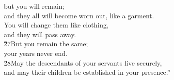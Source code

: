 \begin{poetry}
\poemll    but you will remain; \\
\poeml and they all will become worn out, like a garment. \\
\poemll    You will change them like clothing, \\
\poemlll       and they will pass away. \\
\poeml \v{27}But you remain the same; \\
\poemll    your years never end. \\
\poeml \v{28}May the descendants of your servants live securely, \\
\poemll    and may their children be established in your presence.''
\end{poetry}

